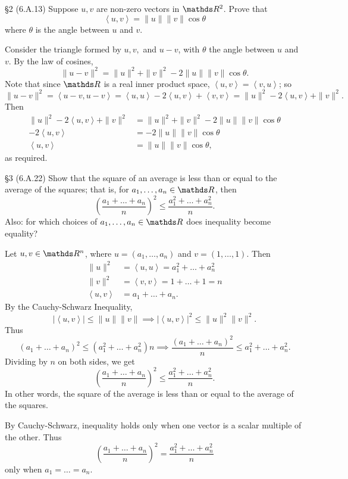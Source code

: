 \documentclass{homework}
\begin{document}
\begin{problem}{\S 2}
  (6.A.13) Suppose $u,v$ are non-zero vectors in $\R^2$. Prove that \[
    \left<u,v \right> =\|u\|\|v\|\cos{\theta}
  \] where $\theta$ is the angle between $u$ and $v$.
\end{problem}
\begin{solution}
  Consider the triangle formed by $u,v,$ and $u-v$, with $\theta$ the angle between $u$ and $v$.
  By the law of cosines, \[
    \|u-v\|^2=\|u\|^2+\|v\|^2-2\|u\|\|v\|\cos{\theta}
  .\] Note that since $\R$ is a real inner product space, $\left<u,v \right> =\left<v,u \right> $;
  so \[
    \|u-v\|^2=\left<u-v,u-v \right> =\left<u,u \right> -2\left<u,v \right> +\left<v,v \right>
    =\|u\|^2-2\left<u,v \right> +\|v\|^2
  .\] Then
  \begin{align*}
    \|u\|^2-2\left<u,v \right> +\|v\|^2&= \|u\|^2+\|v\|^2-2\|u\|\|v\|\cos{\theta} \\
    -2\left<u,v \right> &= -2\|u\|\|v\|\cos{\theta} \\
    \left<u,v \right> &=\|u\|\|v\|\cos{\theta}
  ,\end{align*}as required.
\end{solution}


\begin{problem}{\S 3}
  (6.A.22) Show that the square of an average is less than or equal to the average of the squares;
  that is, for $a_1,\ldots,a_n\in \R$, then \[
    \left( \frac{a_1+\ldots+a_n}{n} \right) ^2\le \frac{a_1^2+\ldots+a_n^2}{n}
  .\] Also: for which choices of $a_1,\ldots,a_n\in \R$ does inequality become equality?
\end{problem}
\begin{solution}
  Let $u,v\in \R^n$, where $u=(a_1,\ldots,a_n)$ and $v=(1,\ldots,1)$. Then
  \begin{align*}
    \|u\|^2&=\left<u,u \right> =a_1^2+\ldots+a_n^2\\
    \|v\|^2&= \left<v,v \right> =1+\ldots+1=n \\
    \left<u,v \right> &= a_1+\ldots+a_n 
  .\end{align*}
  By the Cauchy-Schwarz Inequality, \[
    \left| \left<u,v \right>  \right| \le \|u\|\|v\| \implies \left| \left<u,v \right>  \right|
    ^2\le \|u\|^2\|v\|^2
  .\] Thus \[
  (a_1+\ldots+a_n)^2\le (a_1^2+\ldots+a_n^2)n \implies \frac{(a_1+\ldots+a_n)^2}{n} \le
  a_1^2+\ldots+a_n^2
  .\] Dividing by $n$ on both sides, we get \[
    \left( \frac{a_1+\ldots+a_n}{n} \right) ^2\le \frac{a_1^2+\ldots+a_n^2}{n} 
  .\] In other words, the square of the average is less than or equal to the average of the squares.

  By Cauchy-Schwarz, inequality holds only when one vector is a scalar multiple of the other. Thus
  \[
    \left( \frac{a_1+\ldots+a_n}{n} \right) ^2= \frac{a_1^2+\ldots+a_n^2}{n} 
  \] only when $a_1=\ldots=a_n$.
\end{solution}
\end{document}
